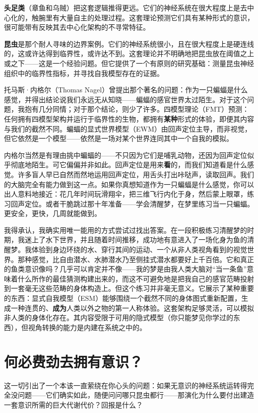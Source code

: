 \documentclass[11pt, twoside, openright]{book}
\begin{document}
\textbf{头足类}（章鱼和乌贼）把这套逻辑推得更远。它们的神经系统在很大程度上是去中心化的，触腕里有大量自主的处理过程。这套理论预测它们具有某种形式的意识，很可能带有反映其去中心化架构的不寻常特征。

\textbf{昆虫}是那个耐人寻味的边界案例。它们的神经系统很小，且在很大程度上是硬连线的，这或许达得到临界性，或许达不到。这套理论并不明确地把昆虫放在阈值之上或之下------这是一个经验问题。但它提供了一个有原则的研究基础：测量昆虫神经组织中的临界性指标，并寻找自我模型存在的证据。

托马斯·内格尔（Thomas Nagel）曾提出那个著名的问题：作为一只蝙蝠是什么感觉，并得出结论说我们永远无从知晓------蝙蝠的感官世界太过陌生。对于这个问题，我抱有几分同情；对于那个结论，则少了许多。四模型理论（FMT）预测：任何拥有四模型架构并运行于临界性的生物，都拥有\textbf{某种}形式的体验，即便其内容与我们的截然不同。蝙蝠的显式世界模型（EWM）由回声定位主导，而非视觉，但它依然是一个模型------依然是一场对某个世界连同其中一个自我的模拟。

内格尔当然是有理由挑中蝙蝠的------不只因为它们是哺乳动物，还因为回声定位似乎彻底地陌生。可它偏偏并非如此。回声定位是用来\textbf{看}的，而我们知道看是什么感觉。许多盲人早已自然而然地运用回声定位，用舌头打出咔哒声，读取回声。我们的大脑完全有能力做到这一点。如果你真想知道作为一只蝙蝠是什么感觉，你可以出人意料地接近：花几年时间玩滑翔伞，把三维飞行内化于身，然后蒙上眼罩，练习回声定位。或者干脆跳过那十年准备------学会清醒梦，在梦里练习当一只蝙蝠。更安全，更快，几周就能做到。

我得承认，我确实用唯一能用的方式尝试过找出答案。在一段积极练习清醒梦的时期，我迷上了水下世界，并且随着时间推移，成功地有意进入了一场化身为鱼的清醒梦。我体验到身边环绕的水、穿行其间的运动、一个从非人类视角看到的视觉世界。那种感觉，比自由潜水、水肺潜水乃至侧挂式潜水都要好上千百倍。它和真正的鱼类意识像吗？几乎可以肯定并不像------我的梦是由我人类大脑对“当一条鱼”意味着什么所作的最佳猜测构建出来的，而这不可避免地是把我自己的感官范畴投射到一套毫无这些范畴的身体构造上。但这个练习并非毫无意义。它展示了某种重要的东西：显式自我模型（ESM）能够围绕一个截然不同的身体图式重新配置，生成一种连贯的、\textbf{成为}人类以外之物的第一人称体验。这套架构足够灵活，可以模拟非人类的身体化存在。其内容受限于可用的隐式模型（你只能梦见你学过的东西），但视角转换的能力是内建在系统之中的。

\section*{何必费劲去拥有意识？}

这一切引出了一个本该一直萦绕在你心头的问题：如果无意识的神经系统运转得完全没问题------它们确实如此，随便问问哪只昆虫都行------那演化为什么要付出建造一套意识所需的巨大代谢代价？回报是什么？
\end{document}
